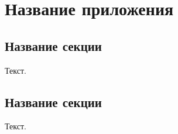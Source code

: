 
\chapter{Название приложения}
\label{app2}

\section{Название секции}
\label{app1:sec1}

Текст.

\section{Название секции}
\label{app2:sec2}

Текст.

